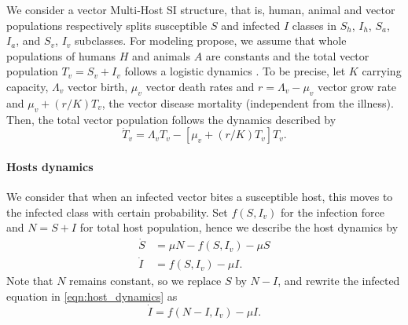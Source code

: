 	We consider a vector Multi-Host SI structure, that is, 
human, animal and vector populations respectively splits susceptible $S$ 
and 
infected $I$ classes in $S_h$, $I_h$, $S_a$, $I_a$, and $S_v$, $I_v$ 
subclasses.
For modeling propose, we assume that whole populations of 
humans $H$ and animals $A$ are constants and the total vector population 
$T_v = S_v + I_v$ follows a logistic dynamics \citep[e.g.][]{Crawford2014}. 
To be precise, let 
$K$ carrying capacity, $\Lambda_{v}$ vector birth, $\mu_{v}$ vector death 
rates  and $r=\Lambda_{v} - \mu_v$ vector grow rate and
$\mu_v+(r/K)T_v$, the vector disease mortality 
(independent from the illness). Then, the total vector 
population follows the dynamics described by
\begin{equation}
	\dot{T}_{v} = \Lambda_{v} T_{v} 
	-\left[ \mu_v + (r/K) T_v \right] T_v.
\end{equation}
%
\paragraph{Hosts dynamics}
	We consider that when an infected vector bites a susceptible host, this moves
to the infected  class with certain probability. Set
$f\left( S,I_{v}\right)$ 
for the infection force and $N=S+I$ 
for total host population, hence we describe the host 
dynamics by
\begin{equation}\label{eqn:host_dynamics}
	\begin{aligned}
		\dot{S} &= \mu N - f\left( S,I_{v}\right) - \mu S\\
		\dot{I} &= f\left( S,I_{v}\right) - \mu I .
	\end{aligned}
\end{equation}
Note that $N$ remains constant, so we replace $S$ by $N -I$, 
and rewrite the infected equation in \eqref{eqn:host_dynamics} as
\begin{equation}\label{eqn:host_infected}
	\dot{I} = f\left( N-I,I_{v}\right) - \mu I.
\end{equation}
